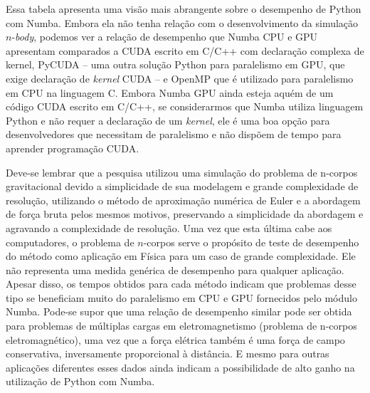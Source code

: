 \documentclass[
	12pt,				%
	a4paper,			%
	english,			%
	openright,				%
	brazil,				%
	oneside]{abntex2}
\begin{document}
	Essa tabela apresenta uma visão mais abrangente sobre o desempenho de Python com Numba. Embora ela não tenha relação com o desenvolvimento da simulação $n$-\textit{body}, podemos ver a relação de desempenho que Numba CPU e GPU apresentam comparados a CUDA escrito em C/C++ com declaração complexa de kernel, PyCUDA -- uma outra solução Python para paralelismo em GPU, que exige declaração de \textit{kernel} CUDA -- e OpenMP que é utilizado para paralelismo em CPU na linguagem C. Embora Numba GPU ainda esteja aquém de um código CUDA escrito em C/C++, se considerarmos que Numba utiliza linguagem Python e não requer a declaração de um \textit{kernel}, ele é uma boa opção para desenvolvedores que necessitam de paralelismo e não dispõem de tempo para aprender programação CUDA.
	
	Deve-se lembrar que a pesquisa utilizou uma simulação do problema de n-corpos gravitacional devido a simplicidade de sua modelagem e grande complexidade de resolução, utilizando o método de aproximação numérica de Euler e a abordagem de força bruta pelos mesmos motivos, preservando a simplicidade da abordagem e agravando a complexidade de resolução. Uma vez que esta última cabe aos computadores, o problema de $n$-corpos serve o propósito de teste de desempenho do método como aplicação em Física para um caso de grande complexidade. Ele não representa uma medida genérica de desempenho para qualquer aplicação. Apesar disso, os tempos obtidos para cada método indicam que problemas desse tipo se beneficiam muito do paralelismo em CPU e GPU fornecidos pelo módulo Numba. Pode-se supor que uma relação de desempenho similar pode ser obtida para problemas de múltiplas cargas em eletromagnetismo (problema de n-corpos eletromagnético), uma vez que a força elétrica também é uma força de campo conservativa, inversamente proporcional à distância. E mesmo para outras aplicações diferentes esses dados ainda indicam a possibilidade de alto ganho na utilização de Python com Numba.

\end{document}
